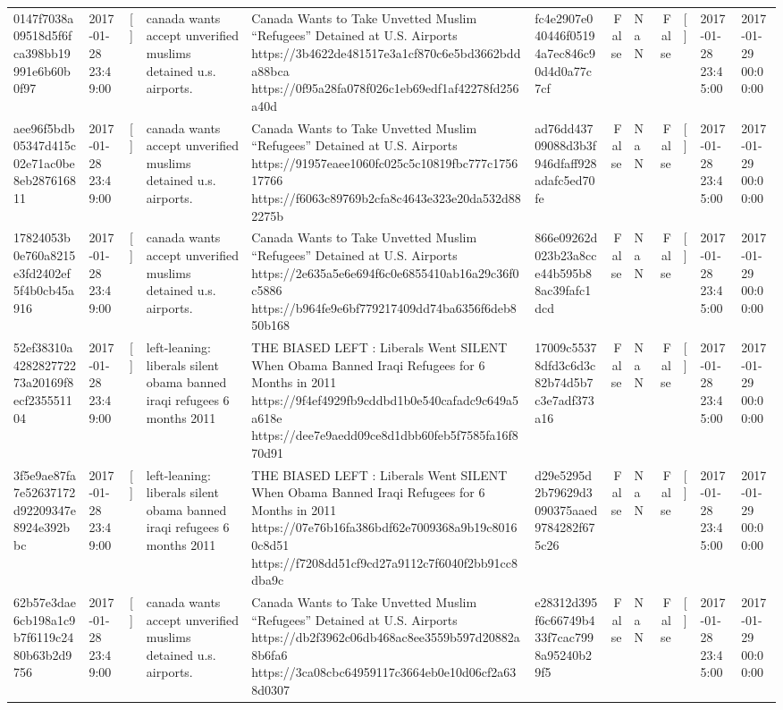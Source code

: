 \begin{tabular}{llllllrlrlll}
0147f7038a09518d5f6fca398bb19991e6b60b0f97 & 2017-01-28 23:49:00 & [] & canada wants accept unverified muslims detained u.s. airports. & Canada Wants to Take Unvetted Muslim “Refugees” Detained at U.S. Airports https://3b4622de481517e3a1cf870c6e5bd3662bdda88bca https://0f95a28fa078f026c1eb69edf1af42278fd256a40d & fc4e2907e040446f05194a7ec846c90d4d0a77c7cf & False & NaN & False & [] & 2017-01-28 23:45:00 & 2017-01-29 00:00:00 \\
aee96f5bdb05347d415c02e71ac0be8eb287616811 & 2017-01-28 23:49:00 & [] & canada wants accept unverified muslims detained u.s. airports. & Canada Wants to Take Unvetted Muslim “Refugees” Detained at U.S. Airports https://91957eaee1060fc025c5c10819fbc777c175617766 https://f6063c89769b2cfa8c4643e323e20da532d882275b & ad76dd43709088d3b3f946dfaff928adafc5ed70fe & False & NaN & False & [] & 2017-01-28 23:45:00 & 2017-01-29 00:00:00 \\
17824053b0e760a8215e3fd2402ef5f4b0cb45a916 & 2017-01-28 23:49:00 & [] & canada wants accept unverified muslims detained u.s. airports. & Canada Wants to Take Unvetted Muslim “Refugees” Detained at U.S. Airports https://2e635a5e6e694f6c0e6855410ab16a29c36f0c5886 https://b964fe9e6bf779217409dd74ba6356f6deb850b168 & 866e09262d023b23a8cce44b595b88ac39fafc1dcd & False & NaN & False & [] & 2017-01-28 23:45:00 & 2017-01-29 00:00:00 \\
52ef38310a428282772273a20169f8ecf235551104 & 2017-01-28 23:49:00 & [] & left-leaning: liberals silent obama banned iraqi refugees 6 months 2011 & THE BIASED LEFT : Liberals Went SILENT When Obama Banned Iraqi Refugees for 6 Months in 2011 https://9f4ef4929fb9cddbd1b0e540cafadc9c649a5a618e https://dee7e9aedd09ce8d1dbb60feb5f7585fa16f870d91 & 17009c55378dfd3c6d3c82b74d5b7c3e7adf373a16 & False & NaN & False & [] & 2017-01-28 23:45:00 & 2017-01-29 00:00:00 \\
3f5e9ae87fa7e52637172d92209347e8924e392bbc & 2017-01-28 23:49:00 & [] & left-leaning: liberals silent obama banned iraqi refugees 6 months 2011 & THE BIASED LEFT : Liberals Went SILENT When Obama Banned Iraqi Refugees for 6 Months in 2011 https://07e76b16fa386bdf62e7009368a9b19c80160c8d51 https://f7208dd51cf9cd27a9112c7f6040f2bb91cc8dba9c & d29e5295d2b79629d3090375aaed9784282f675c26 & False & NaN & False & [] & 2017-01-28 23:45:00 & 2017-01-29 00:00:00 \\
62b57e3dae6cb198a1c9b7f6119c2480b63b2d9756 & 2017-01-28 23:49:00 & [] & canada wants accept unverified muslims detained u.s. airports. & Canada Wants to Take Unvetted Muslim “Refugees” Detained at U.S. Airports https://db2f3962c06db468ac8ee3559b597d20882a8b6fa6 https://3ca08cbc64959117c3664eb0e10d06cf2a638d0307 & e28312d395f6c66749b433f7cac7998a95240b29f5 & False & NaN & False & [] & 2017-01-28 23:45:00 & 2017-01-29 00:00:00 \\

\end{tabular}
